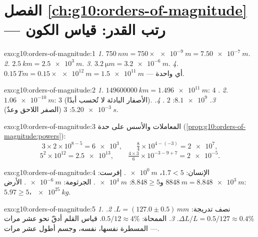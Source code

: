 \section*{الفصل \ref{ch:g10:orders-of-magnitude} --- رتب القدر: قياس الكون}

\begin{solution}{exo:g10:orders-of-magnitude:1}
\emph{1.} $\qty{750}{nm} = 750 \times \qty{e-9}{m} = \qty{7.50e-7}{m}$.
\emph{2.} $\qty{2.5}{km} = \qty{2.5e3}{m}$.
\emph{3.} $\qty{3.2}{\micro m} = \qty{3.2e-6}{m}$.
\emph{4.} $\qty{0.15}{Tm} = 0.15 \times \qty{e12}{m} = \qty{1.5e11}{m}$
--- أي  واحدة.
\end{solution}

\begin{solution}{exo:g10:orders-of-magnitude:2}
\emph{1.} $\qty{149600000}{km} = \qty{1.496e11}{m}$: $4$ .
\emph{2.} $\qty{1.06e-10}{m}$: $3$  (الأصفار البادئة
لا تُحسب أبدًا).
\emph{3.} $\num{8.1e9}$: $2$ .
\emph{4.} $\qty{5.20e-3}{s}$: $3$  (الصفر اللاحق
وعدٌ).
\end{solution}

\begin{solution}{exo:g10:orders-of-magnitude:3}
المعاملات والأسس على حدة
(\cref{prop:g10:orders-of-magnitude:powers}):
\[
3 \times 2 \times 10^{8-5} = \num{6e3}, \qquad
\tfrac{8}{4} \times 10^{4-(-3)} = \num{2e7},
\]
\[
5^{2} \times 10^{12} = \num{2.5e13}, \qquad
\tfrac{4 \times 3}{6} \times 10^{-3-9+7} = \num{2e-5} .
\]
\end{solution}

\begin{solution}{exo:g10:orders-of-magnitude:4}
الإنسان: $1.7 < 5$،  $\qty{e0}{m}$. إفرست:
$\qty{8848}{m} = \qty{8.848e3}{m}$ و$8.848 \geq 5$: 
$\qty{e4}{m}$. الجرثومة:  $\qty{e-6}{m}$. الأرض:
$5.97 \geq 5$،  $\qty{e25}{kg}$.
\end{solution}

\begin{solution}{exo:g10:orders-of-magnitude:5}
\emph{1.} نصف تدريجة: $L = (127.0 \pm 0.5)\,\unit{mm}$.
\emph{2.} $\Delta L / L = 0.5/127 \approx 0.4\%$.
\emph{3.} الممحاة: $0.5/12 \approx 4\%$. قياس القلم أدقّ
نحو عشر مرات --- المسطرة نفسها،  نفسه،
وجسم أطول عشر مرات.
\end{solution}

